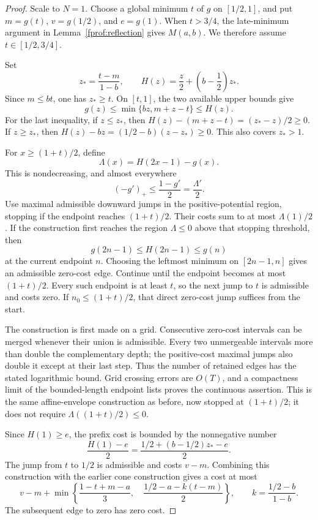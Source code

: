 \begin{proof}
Scale to \(N=1\). Choose a global minimum \(t\) of \(g\) on
\([1/2,1]\), and put \(m=g(t)\), \(v=g(1/2)\), and \(e=g(1)\).
When \(t>3/4\), the late-minimum argument in
Lemma~\ref{fprof:reflection} gives \(M(a,b)\). We therefore assume
\(t\in[1/2,3/4]\).

Set
$$
 z_* =\frac{t-m}{1-b},\qquad
 H(z)=\frac z2+\left(b-\frac12\right)z_*.
$$
Since \(m\le bt\), one has \(z_*\ge t\). On \([t,1]\), the two
available upper bounds give
$$
 g(z)\le\min\{bz,m+z-t\}\le H(z).
$$
For the last inequality, if \(z\le z_*\), then
\(H(z)-(m+z-t)=(z_*-z)/2\ge0\). If \(z\ge z_*\), then
\(H(z)-bz=(1/2-b)(z-z_*)\ge0\). This also covers \(z_*>1\).

For \(x\ge(1+t)/2\), define
$$
 \Lambda(x)=H(2x-1)-g(x).
$$
This is nondecreasing, and almost everywhere
$$
 (-g')_+\le\frac{1-g'}2=\frac{\Lambda'}2.
$$
Use maximal admissible downward jumps in the positive-potential region,
stopping if the endpoint reaches \((1+t)/2\). Their costs sum to at most
\(\Lambda(1)/2\). If the construction first reaches the region
\(\Lambda\le0\) above that stopping threshold, then
$$
 g(2n-1)\le H(2n-1)\le g(n)
$$
at the current endpoint \(n\). Choosing the leftmost minimum on
\([2n-1,n]\) gives an admissible zero-cost edge. Continue until the
endpoint becomes at most \((1+t)/2\). Every such endpoint is at least
\(t\), so the next jump to \(t\) is admissible and costs zero.
If \(n_0\le(1+t)/2\), that direct zero-cost jump suffices from the start.

The construction is first made on a grid. Consecutive zero-cost intervals
can be merged whenever their union is admissible. Every two unmergeable
intervals more than double the complementary depth; the positive-cost
maximal jumps also double it except at their last step. Thus the number
of retained edges has the stated logarithmic bound. Grid crossing errors
are \(O(T)\), and a compactness limit of the bounded-length endpoint
lists proves the continuous assertion. This is the same affine-envelope
construction as before, now stopped at \((1+t)/2\); it does not require
\(\Lambda((1+t)/2)\le0\).

Since \(H(1)\ge e\), the prefix cost is bounded by the nonnegative number
$$
 \frac{H(1)-e}{2}
 =\frac{1/2+(b-1/2)z_*-e}{2}.
$$
The jump from \(t\) to \(1/2\) is admissible and costs \(v-m\).
Combining this construction with the earlier cone construction gives
a cost at most
\begin{equation}\label{fprof:small-scalar}
 v-m+\min\left\{
 \frac{1-t+m-a}{3},\quad
 \frac{1/2-a-k(t-m)}2
 \right\},\qquad
 k=\frac{1/2-b}{1-b}.
\end{equation}
The subsequent edge to zero has zero cost.


\end{proof}
